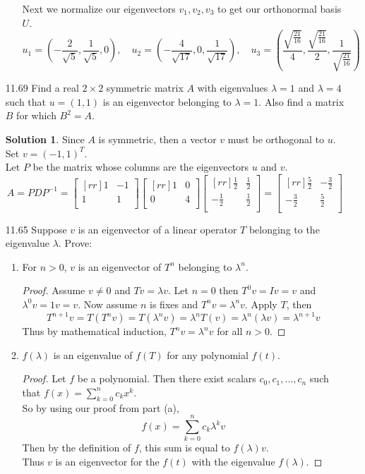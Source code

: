 \documentclass[12pt]{article}
\theoremstyle{definition}
\newtheorem*{solution}{Solution} %
\theoremstyle{plain}
\begin{document}
\begin{enumerate}
\begin{enumerate}
	Next we normalize our eigenvectors $v_1,v_2,v_3$ to get our orthonormal basis $U$.
	\[ u_1=(-\frac{2}{\sqrt{5}},\frac{1}{\sqrt{5}},0),\quad u_2=(-\frac{4}{\sqrt{17}},0,\frac{1}{\sqrt{17}}),\quad u_3=(\frac{\sqrt{\frac{21}{16}}}{4},\frac{\sqrt{\frac{21}{16}}}{2},\frac{1}{\sqrt{\frac{21}{16}}}) \]
	\end{enumerate}
\item[11.69]Find a real $2 \times 2$ symmetric matrix $A$ with eigenvalues $\lambda = 1$ and $\lambda = 4$ such that $u=(1,1)$ is an eigenvector belonging to $\lambda=1$. Also find a matrix $B$ for which $B^2=A$.
	\begin{solution}
	Since $A$ is symmetric, then a vector $v$ must be orthogonal to $u$. Set $v=(-1,1)^T$.\\
	Let $P$ be the matrix whose columns are the eigenvectors $u$ and $v$.
	\[ A=PDP^{-1}=\begin{bmatrix}[rr]1&-1\\1&1\\\end{bmatrix}\begin{bmatrix}[rr]1&0\\0&4\\\end{bmatrix}\begin{bmatrix}[rr]\frac{1}{2}&\frac{1}{2}\\-\frac{1}{2}&\frac{1}{2}\\\end{bmatrix} =  \begin{bmatrix}[rr]\frac{5}{2}&-\frac{3}{2}\\-\frac{3}{2}&\frac{5}{2}\\\end{bmatrix} \]
	\end{solution}
\item[11.65]Suppose $v$ is an eigenvector of a linear operator $T$ belonging to the eigenvalue $\lambda$. Prove:
	\begin{enumerate}
	\item For $n>0$, $v$ is an eigenvector of $T^n$ belonging to $\lambda^n$.
	\begin{proof}
Assume $v\neq 0$ and $Tv=\lambda v$.
Let $n=0$ then $T^0v=Iv=v$ and $\lambda^0v=1v=v$. Now assume $n$ is fixes and $T^nv=\lambda^nv$. Apply $T$, then 
\[T^{n+1}v=T(T^nv)=T(\lambda^nv)=\lambda^nT(v) = \lambda^n(\lambda v)=\lambda^{n+1}v \]
Thus by mathematical induction, $T^nv=\lambda^nv$ for all $n > 0$.
\end{proof}
	\item $f(\lambda)$ is an eigenvalue of $f(T)$ for any polynomial $f(t)$.
	\begin{proof}
Let $f$ be a polynomial. Then there exist scalars $c_0,c_1,...,c_n$ such that $f(x)=\sum_{k=0}^nc_kx^k$.\\
So by using our proof from part (a),
\[ f(x)=\sum_{k=0}^nc_k\lambda^kv \]
Then by the definition of $f$, this sum is equal to $f(\lambda)v$.\\
Thus $v$ is an eigenvector for the $f(t)$ with the eigenvalue $f(\lambda)$.
\end{proof}
	\end{enumerate}
	
\end{enumerate}	
\end{document}
